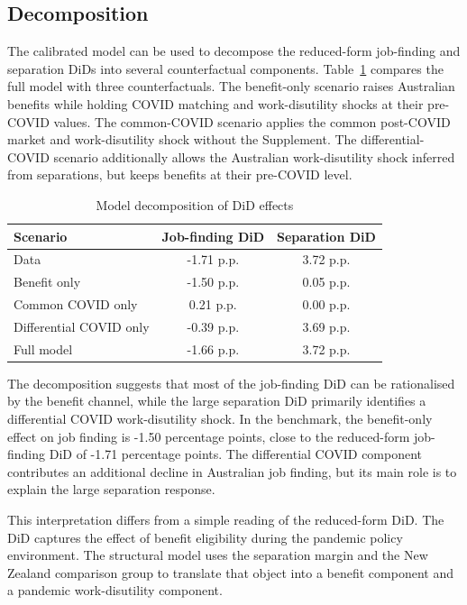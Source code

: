 \subsection{Decomposition}

The calibrated model can be used to decompose the reduced-form job-finding and separation DiDs into several counterfactual components. Table~\ref{tab:model_decomp_14} compares the full model with three counterfactuals. The benefit-only scenario raises Australian benefits while holding COVID matching and work-disutility shocks at their pre-COVID values. The common-COVID scenario applies the common post-COVID market and work-disutility shock without the Supplement. The differential-COVID scenario additionally allows the Australian work-disutility shock inferred from separations, but keeps benefits at their pre-COVID level.

\begin{table}[htbp]
    \centering
    \caption{Model decomposition of DiD effects}
    \label{tab:model_decomp_14}
    \begin{tabular}{lcc}
        \toprule
        Scenario & Job-finding DiD & Separation DiD \\
        \midrule
        Data & -1.71 p.p. & 3.72 p.p. \\
        Benefit only & -1.50 p.p. & 0.05 p.p. \\
        Common COVID only & 0.21 p.p. & 0.00 p.p. \\
        Differential COVID only & -0.39 p.p. & 3.69 p.p. \\
        Full model & -1.66 p.p. & 3.72 p.p. \\
        \bottomrule
    \end{tabular}
\end{table}

The decomposition suggests that most of the job-finding DiD can be rationalised by the benefit channel, while the large separation DiD primarily identifies a differential COVID work-disutility shock. In the benchmark, the benefit-only effect on job finding is -1.50 percentage points, close to the reduced-form job-finding DiD of -1.71 percentage points. The differential COVID component contributes an additional decline in Australian job finding, but its main role is to explain the large separation response.

This interpretation differs from a simple reading of the reduced-form DiD. The DiD captures the effect of benefit eligibility during the pandemic policy environment. The structural model uses the separation margin and the New Zealand comparison group to translate that object into a benefit component and a pandemic work-disutility component.

